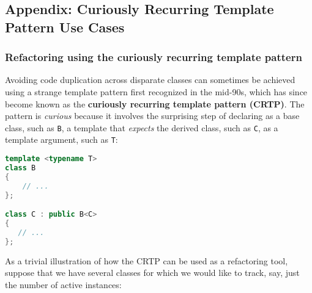\subsection[Appendix: Curiously Recurring Template Pattern Use Cases]{Appendix: Curiously Recurring Template Pattern Use Cases}\label{appendix:-crtp-use-cases}

\subsubsection[Refactoring using the curiously recurring template pattern]{Refactoring using the curiously recurring template pattern}\label{refactoring-using-the-curiously-recurring-template-pattern}

Avoiding code duplication across disparate classes can sometimes be
achieved using a strange template pattern first recognized in the
mid-90s, which has since become known as the \textbf{curiously recurring
template pattern (CRTP)}. The pattern is \emph{curious} because it
involves the surprising step of declaring as a base class, such as
\texttt{B}, a template that \emph{expects} the derived class, such as
\texttt{C}, as a template argument, such as \texttt{T}:

\begin{lstlisting}[language=C++]
template <typename T>
class B
{
    // ...
};

class C : public B<C>
{
   // ...
};
\end{lstlisting}
    
\noindent As a trivial illustration of how the CRTP can be used as a refactoring tool,
suppose that we have several classes for which we would like to track,
say, just the number of active instances:

